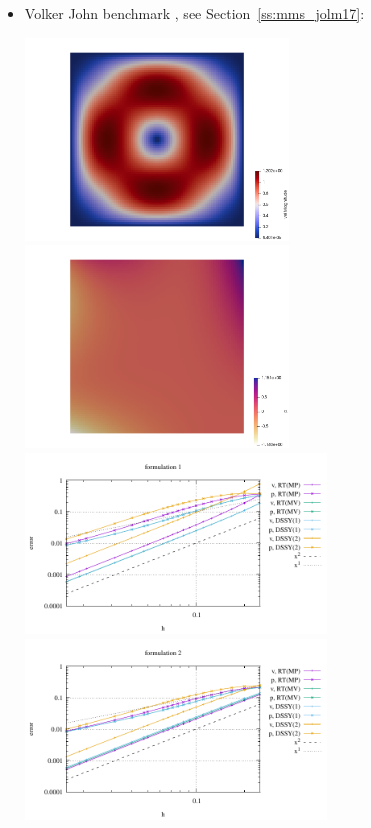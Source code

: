 \begin{itemize}
\item Volker John benchmark \cite{jolm17}, see Section~\ref{ss:mms_jolm17}:

\begin{center}
\includegraphics[width=7cm]{python_codes/fieldstone_77/results/vj/vel}
\includegraphics[width=7cm]{python_codes/fieldstone_77/results/vj/press}\\
\includegraphics[width=8cm]{python_codes/fieldstone_77/results/vj/errors_form1}
\includegraphics[width=8cm]{python_codes/fieldstone_77/results/vj/errors_form2}\\

\end{center}
\end{itemize}
